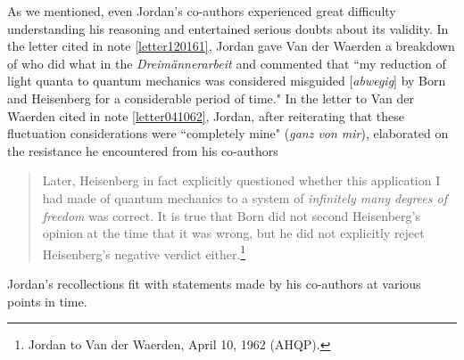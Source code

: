 \documentclass{elsart}
\begin{document}
As we mentioned, even Jordan's co-authors experienced great difficulty understanding his reasoning and entertained serious doubts about its validity. In the letter cited in note \ref{letter120161}, Jordan gave Van der Waerden a breakdown of who did what in the  {\it Dreim\"annerarbeit} and commented that ``my reduction of light quanta to quantum mechanics was considered misguided [{\it abwegig}] by Born and Heisenberg for a considerable period of time." In the letter to Van der Waerden cited in note \ref{letter041062}, Jordan, after  reiterating that these fluctuation considerations were ``completely mine" ({\it ganz von mir}),  elaborated on the resistance he encountered from his co-authors
\begin{quotation}
Later, Heisenberg in fact explicitly questioned whether this application I had made of quantum mechanics to a system of {\it infinitely many degrees of freedom} was correct. It is true that Born did not second Heisenberg's opinion at the time that it was wrong, but he did not explicitly reject Heisenberg's negative verdict either.\footnote{\label{letter041062a}Jordan to Van der Waerden, April 10, 1962 (AHQP).} 
\end{quotation}
Jordan's recollections fit with statements made by his co-authors at various points in time. 
\end{document}
